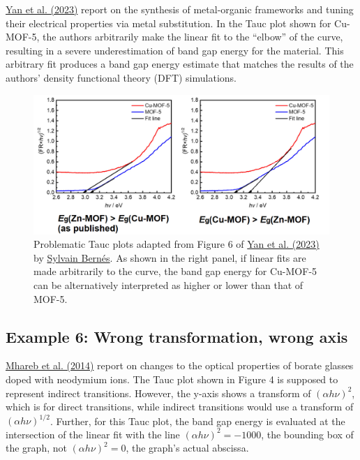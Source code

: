 \documentclass[letterpaper, 12pt]{article}
\begin{document}
\href{https://doi.org/10.1021/acsami.3c08470}{Yan et al. (2023)} report on the synthesis of metal-organic frameworks and tuning their electrical properties via metal substitution. In the Tauc plot shown for Cu-MOF-5, the authors arbitrarily make the linear fit to the ``elbow'' of the curve, resulting in a severe underestimation of band gap energy for the material. This arbitrary fit produces a band gap energy estimate that matches the results of the authors' density functional theory (DFT) simulations.

\begin{figure}[h!tbp]
    \centering
    \includegraphics[width=\textwidth]{img/tauc/image-1736207336000.png}
    \caption*{Problematic Tauc plots adapted from Figure 6 of \href{https://doi.org/10.1021/acsami.3c08470}{Yan et al. (2023)} by \href{https://pubpeer.com/publications/7EBEC9D9FBC9A017CB258235844AB5\#3}{Sylvain Bern\'es}. As shown in the right panel, if linear fits are made arbitrarily to the curve, the band gap energy for Cu-MOF-5 can be alternatively interpreted as higher or lower than that of MOF-5.}
\end{figure}

\pagebreak

\subsection*{Example 6: Wrong transformation, wrong axis}

\href{https://doi.org/10.1016/j.optmat.2014.06.033}{Mhareb et al. (2014)} report on changes to the optical properties of borate glasses doped with neodymium ions. The Tauc plot shown in Figure 4 is supposed to represent indirect transitions. However, the y-axis shows a transform of $(\alpha h \nu)^{2}$, which is for direct transitions, while indirect transitions would use a transform of $(\alpha h \nu)^{1/2}$. Further, for this Tauc plot, the band gap energy is evaluated at the intersection of the linear fit with the line $(\alpha h \nu)^{2} = -1000$, the bounding box of the graph, not $(\alpha h \nu)^{2} = 0$, the graph's actual abscissa.
\end{document}
